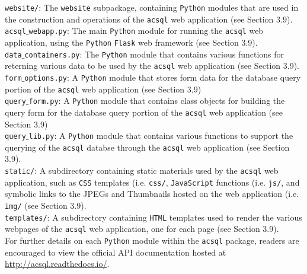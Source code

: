 \documentclass[10pt,journal,compsoc]{IEEEtran}
\begin{document}
\noindent\texttt{website/}: The \texttt{website} subpackage, containing \texttt{Python} modules that are used in the construction and
operations of the \texttt{acsql} web application (see Section 3.9).\\

\noindent\texttt{acsql$\_$webapp.py}: The main \texttt{Python} module for running the \texttt{acsql} web application, using the \texttt{Python}
\texttt{Flask} web framework (see Section 3.9).\\

\noindent\texttt{data$\_$containers.py}: The \texttt{Python} module that contains various functions for reterning various data to be used
by the \texttt{acsql} web application (see Section 3.9).\\

\noindent\texttt{form$\_$options.py}: A \texttt{Python} module that stores form data for the database query portion of the \texttt{acsql}
web application (see Section 3.9)\\

\noindent\texttt{query$\_$form.py}: A \texttt{Python} module that contains class objects for building the query form for the database
query portion of the \texttt{acsql} web application (see Section 3.9)\\

\noindent\texttt{query$\_$lib.py}: A \texttt{Python} module that contains various functions to support the querying of the \texttt{acsql}
databse through the \texttt{acsql} web application (see Section 3.9).\\

\noindent\texttt{static/}: A subdirectory containing static materials used by the \texttt{acsql} web application, such as \texttt{CSS}
templates (i.e. \texttt{css/}, \texttt{JavaScript} functions (i.e. \texttt{js/}, and symbolic links to the JPEGs and Thumbnails hosted
on the web application (i.e. \texttt{img/} (see Section 3.9).\\

\noindent\texttt{templates/}: A subdirectory containing \texttt{HTML} templates used to render the various webpages of the \texttt{acsql}
web application, one for each page (see Section 3.9).\\

For further details on each \texttt{Python} module within the \texttt{acsql} package, readers are encouraged to view the official
API documentation hosted at \url{http://acsql.readthedocs.io/}.


\end{document}
